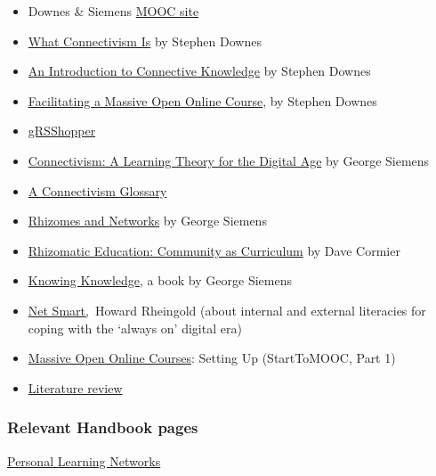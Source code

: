 \begin{itemize}
\item
  Downes \& Siemens \href{http://change.mooc.ca}{MOOC site}
\item
  \href{http://halfanhour.blogspot.com/2007/02/what-connectivism-is.html}{What
  Connectivism Is} by Stephen Downes
\item
  \href{http://www.downes.ca/post/33034}{An Introduction to Connective
  Knowledge} by Stephen Downes
\item
  \href{http://www.downes.ca/presentation/290}{Facilitating a Massive
  Open Online Course}, by Stephen Downes
\item
  \href{http://grsshopper.downes.ca/index.html}{gRSShopper}
\item
  \href{\%20http://www.elearnspace.org/Articles/connectivism.htm}{Connectivism:
  A Learning Theory for the Digital Age} by George Siemens
\item
  \href{http://en.wikiversity.org/wiki/Connectivism\_glossary}{A
  Connectivism Glossary}
\item
  \href{http://www.connectivism.ca/?p=329}{Rhizomes and Networks} by
  George Siemens
\item
  \href{http://innovateonline.info/pdf/vol4\_issue5/Rhizomatic\_Education-\_\_Community\_as\_Curriculum.pdf}{Rhizomatic
  Education: Community as Curriculum} by Dave Cormier
\item
  \href{http://www.amazon.ca/Knowing-Knowledge-George-Siemens/dp/1430302305}{Knowing
  Knowledge}, a book by George Siemens
\item
  \href{http://www.amazon.com/Net-Smart-ebook/dp/B007D5UP9G}{Net
  Smart,}~Howard Rheingold (about internal and external literacies for
  coping with the `always on' digital era)
\item
  \href{http://www.learningsolutionsmag.com/articles/886/}{Massive Open
  Online Courses}: Setting Up (StartToMOOC, Part 1)
\item
  \href{https://docs.google.com/document/d/14GtDeiMkA61B7vPDSPGLfIzGumOyDhGIlLNcQCv0gec/edit}{Literature
  review}
\end{itemize}

\subsubsection{Relevant Handbook pages}

\href{http://socialmediaclassroom.com/host/peeragogy/wiki/personal-learning-networks}{Personal
Learning Networks}
